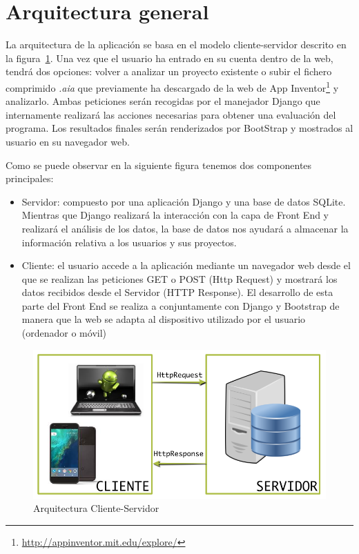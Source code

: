\documentclass[a4paper, 12pt]{book}
\begin{document}
\section{Arquitectura general} 
\label{sec:arquitectura}
La arquitectura de la aplicación se basa en el modelo cliente-servidor descrito en la figura~\ref{fig:arquitectura}. Una vez que el usuario ha entrado en su cuenta dentro de la web, tendrá dos opciones: volver a analizar un proyecto existente o subir el fichero comprimido \textit{.aia} que previamente ha descargado de la web de App Inventor\footnote{\url{http://appinventor.mit.edu/explore/}} y analizarlo. Ambas peticiones serán recogidas por el manejador Django que internamente realizará las acciones necesarias para obtener una evaluación del programa. Los resultados finales serán renderizados por BootStrap y mostrados al usuario en su navegador web. 

Como se puede observar en la siguiente figura tenemos dos componentes principales:
\begin{itemize}
		\item Servidor: compuesto por una aplicación Django y una base de datos SQLite. Mientras que Django realizará la interacción con la capa de Front End y realizará el análisis de los datos, la base de datos nos ayudará a almacenar la información relativa a los usuarios y sus proyectos.   
		\item Cliente: el usuario accede a la aplicación mediante un navegador web desde el que se realizan las peticiones GET o POST (Http Request) y mostrará los datos recibidos desde el Servidor (HTTP Response). El desarrollo de esta parte del Front End se realiza a conjuntamente con Django y Bootstrap de manera que la web se adapta al dispositivo utilizado por el usuario (ordenador o móvil) 
\end{itemize}

\begin{figure}[H]
  \centering
  \includegraphics[width=0.70\linewidth, keepaspectratio]{img/arquitectura}
  \caption{Arquitectura Cliente-Servidor}
  \label{fig:arquitectura}
\end{figure}
\end{document}
